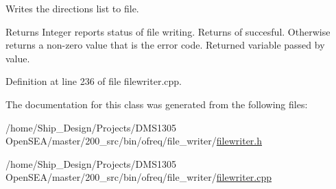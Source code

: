Writes the directions list to file. 

\begin{DoxyReturn}{Returns}
Integer reports status of file writing. Returns of succesful. Otherwise returns a non-\/zero value that is the error code. Returned variable passed by value. 
\end{DoxyReturn}


Definition at line 236 of file filewriter.\-cpp.



The documentation for this class was generated from the following files\-:\begin{DoxyCompactItemize}
\item 
/home/\-Ship\-\_\-\-Design/\-Projects/\-D\-M\-S1305 Open\-S\-E\-A/master/200\-\_\-src/bin/ofreq/file\-\_\-writer/\hyperlink{filewriter_8h}{filewriter.\-h}\item 
/home/\-Ship\-\_\-\-Design/\-Projects/\-D\-M\-S1305 Open\-S\-E\-A/master/200\-\_\-src/bin/ofreq/file\-\_\-writer/\hyperlink{filewriter_8cpp}{filewriter.\-cpp}\end{DoxyCompactItemize}
